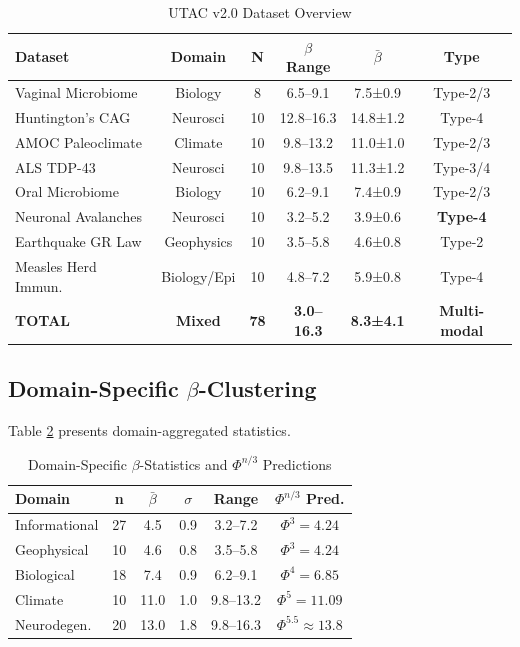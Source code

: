 \documentclass[11pt,a4paper]{article}
\begin{document}
\begin{table}[h]
\centering
\caption{UTAC v2.0 Dataset Overview}
\label{tab:datasets}
\begin{tabular}{lccccc}
\toprule
\textbf{Dataset} & \textbf{Domain} & \textbf{N} & \textbf{$\beta$ Range} & \textbf{$\bar{\beta}$} & \textbf{Type} \\
\midrule
Vaginal Microbiome & Biology & 8 & 6.5--9.1 & 7.5±0.9 & Type-2/3 \\
Huntington's CAG & Neurosci & 10 & 12.8--16.3 & 14.8±1.2 & Type-4 \\
AMOC Paleoclimate & Climate & 10 & 9.8--13.2 & 11.0±1.0 & Type-2/3 \\
ALS TDP-43 & Neurosci & 10 & 9.8--13.5 & 11.3±1.2 & Type-3/4 \\
Oral Microbiome & Biology & 10 & 6.2--9.1 & 7.4±0.9 & Type-2/3 \\
Neuronal Avalanches & Neurosci & 10 & 3.2--5.2 & 3.9±0.6 & \textbf{Type-4} \\
Earthquake GR Law & Geophysics & 10 & 3.5--5.8 & 4.6±0.8 & Type-2 \\
Measles Herd Immun. & Biology/Epi & 10 & 4.8--7.2 & 5.9±0.8 & Type-4 \\
\midrule
\textbf{TOTAL} & \textbf{Mixed} & \textbf{78} & \textbf{3.0--16.3} & \textbf{8.3±4.1} & \textbf{Multi-modal} \\
\bottomrule
\end{tabular}
\end{table}

\subsection{Domain-Specific $\beta$-Clustering}

Table \ref{tab:domains} presents domain-aggregated statistics.

\begin{table}[h]
\centering
\caption{Domain-Specific $\beta$-Statistics and $\Phi^{n/3}$ Predictions}
\label{tab:domains}
\begin{tabular}{lccccc}
\toprule
\textbf{Domain} & \textbf{n} & \textbf{$\bar{\beta}$} & \textbf{$\sigma$} & \textbf{Range} & \textbf{$\Phi^{n/3}$ Pred.} \\
\midrule
Informational & 27 & 4.5 & 0.9 & 3.2--7.2 & $\Phi^3 = 4.24$ \\
Geophysical & 10 & 4.6 & 0.8 & 3.5--5.8 & $\Phi^3 = 4.24$ \\
Biological & 18 & 7.4 & 0.9 & 6.2--9.1 & $\Phi^4 = 6.85$ \\
Climate & 10 & 11.0 & 1.0 & 9.8--13.2 & $\Phi^5 = 11.09$ \\
Neurodegen. & 20 & 13.0 & 1.8 & 9.8--16.3 & $\Phi^{5.5} \approx 13.8$ \\
\bottomrule
\end{tabular}
\end{table}
\end{document}
